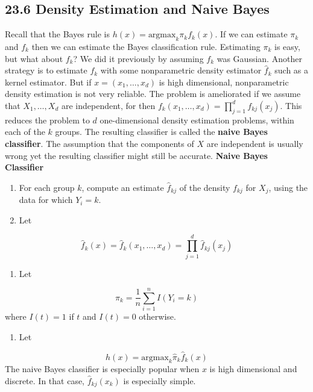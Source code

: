 \subsection*{23.6 Density Estimation and Naive Bayes}\label{density-estimation-and-naive-bayes}
Recall that the Bayes rule is \(h(x) = \text{argmax}_{k} \pi_{k} f_{k}(x)\).
If we can estimate \(\pi_{k}\) and \(f_{k}\) then we can estimate the Bayes
classification rule. Estimating \(\pi_{k}\) is easy, but what about
\(f_{k}\)? We did it previously by assuming \(f_{k}\) was Gaussian. Another
strategy is to estimate \(f_{k}\) with some nonparametric density
estimator \(\hat{f}_{k}\) such as a kernel estimator. But if
\(x = (x_{1}, \dots, x_d)\) is high dimensional, nonparametric density
estimation is not very reliable. The problem is ameliorated if we assume
that \(X_{1}, \dots, X_d\) are independent, for then
\(f_{k}(x_{1}, \dots, x_d) = \prod_{j=1}^{d} f_{kj}(x_{j})\). This reduces the
problem to \(d\) one-dimensional density estimation problems, within
each of the \(k\) groups. The resulting classifier is called the
\textbf{naive Bayes classifier}. The assumption that the components of
\(X\) are independent is usually wrong yet the resulting classifier
might still be accurate.
\textbf{Naive Bayes Classifier}
\begin{enumerate}
\def\labelenumi{\arabic{enumi}.}
\item
  For each group \(k\), compute an estimate \(\hat{f}_{kj}\) of the
  density \(f_{kj}\) for \(X_{j}\), using the data for which \(Y_{i} = k\).
\item
  Let
\end{enumerate}
\[
\hat{f}_{k}(x) = \hat{f}_{k}(x_{1}, \dots, x_d) = \prod_{j=1}^{d} \hat{f}_{kj}(x_{j})
\]
\begin{enumerate}[tightlist,label={\arabic*.},resume]
\item
  Let
\end{enumerate}
\[
\hat{\pi}_{k} = \frac{1}{n} \sum_{i=1}^{n} I(Y_{i} = k)
\]
where \(I(t) = 1\) if \(t\) and \(I(t) = 0\) otherwise.
\begin{enumerate}[tightlist,label={\arabic*.},resume]
\item
  Let
\end{enumerate}
\[
h(x) = \text{argmax}_{k} \hat{\pi}_{k} \hat{f}_{k}(x)
\]
The naive Bayes classifier is especially popular when \(x\) is high
dimensional and discrete. In that case, \(\hat{f}_{kj}(x_{k})\) is
especially simple.

